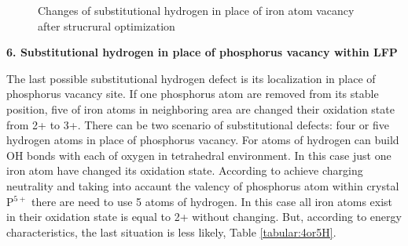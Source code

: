 \begin{figure}[h]
\begin{minipage}[h]{0.49\linewidth}
\end{minipage}
\hfill
\begin{minipage}[h]{0.49\linewidth}
\end{minipage}
\caption{Changes of substitutional hydrogen in place of iron atom vacancy after strucrural optimization}
\label{ris:Fe2H}
\end{figure}

\textbf{6. Substitutional hydrogen in place of phosphorus vacancy within LFP}

The last possible substitutional hydrogen defect is its localization in place of phosphorus vacancy site. If one phosphorus atom are removed from its stable position, five of iron atoms in neighboring area are changed their oxidation state from 2+ to 3+. There can be two scenario of substitutional defects: four or five hydrogen atoms in place of phosphorus vacancy. For atoms of hydrogen can build OH bonds with each of oxygen in tetrahedral environment. In this case just one iron atom have changed its oxidation state. According to achieve charging neutrality and taking into accaunt the valency of phosphorus atom within crystal P$^{5+}$ there are need to use 5 atoms of hydrogen. In this case all iron atoms exist in their oxidation state is equal to 2+ without changing. But, according to energy characteristics, the last situation is less likely, Table \ref{tabular:4or5H}. 

